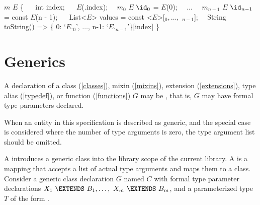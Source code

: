 \documentclass[makeidx]{article}
\begin{document}
\begin{normativeDartCode}
$m$ \CLASS{} $E$ \{
\ \ \FINAL{} int index;
\ \ \CONST{} $E$(\THIS.index);
\ \ $m_0$ \STATIC{} \CONST{} $E$ $\id_0$ = \CONST{} $E$(0);
\ \ $\ldots$
\ \ $m_{n-1}$ \STATIC{} \CONST{} $E$ $\id_{n-1}$ = const $E$(n - 1);
\ \ \STATIC{} \CONST{} List<$E$> values = const <$E$>[\id$_0, \ldots, $ \id$_{n-1}$];
\ \ String toString() => \{ 0: `$E$.\id$_0$', $\ldots$, n-1: `$E$.\id$_{n-1}$'\}[index]
\}
\end{normativeDartCode}



\section{Generics}

\LMHash{}%
A declaration of a class (\ref{classes}),
mixin (\ref{mixins}),
extension (\ref{extensions}),
type alias (\ref{typedef}),
or function (\ref{functions}) $G$ may be ,
that is, $G$ may have formal type parameters declared.

\LMHash{}%
When an entity in this specification is described as generic,
and the special case is considered where the number of type arguments is zero,
the type argument list should be omitted.


\LMHash{}%
A 
introduces a generic class into the library scope of the current library.
A 
is a mapping that accepts a list of actual type arguments
and maps them to a class.
Consider a generic class declaration $G$ named $C$
with formal type parameter declarations
$X_1\ \EXTENDS\ B_1, \ldots,\ X_m\ \EXTENDS\ B_m$,
and a parameterized type $T$ of the form .
\end{document}
